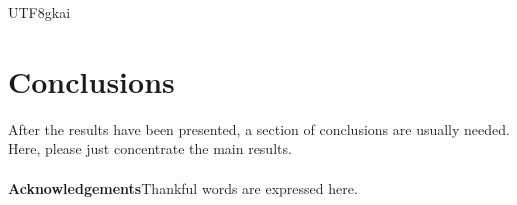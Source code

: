 \documentclass[a4paper, 11pt, twoside]{article}
\begin{document}
\begin{CJK*}{UTF8}{gkai}



\section{Conclusions}
After the results have been presented, a section of conclusions are
usually needed. Here, please just concentrate the main results.\\
\\
\noindent  \textbf{Acknowledgements}\quad\footnotesize   Thankful words are expressed here.   %


\end{CJK*}
\end{document}
